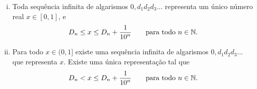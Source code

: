 \begin{prop} \label{prop:decimalprop}
\leavevmode
\begin{enumerate}[(i)]
\item
Toda sequência infinita de algarismos
$0{,}d_1d_2d_3\ldots$ representa um único número real $x \in [0,1]$, e
\begin{equation*}
D_n \leq x \leq D_n+\frac{1}{{10}^n} \qquad \text{para todo } n \in {\mathbb{N}}.
\end{equation*}
\item
Para todo $x \in (0,1]$ existe uma sequência infinita de algarismos
$0{,}d_1d_2d_3\ldots$ que representa $x$.
Existe uma única representação tal que
\begin{equation*}
D_n < x \leq D_n+\frac{1}{{10}^n} \qquad \text{para todo } n \in {\mathbb{N}}.
\end{equation*}
\end{enumerate}
\end{prop}

